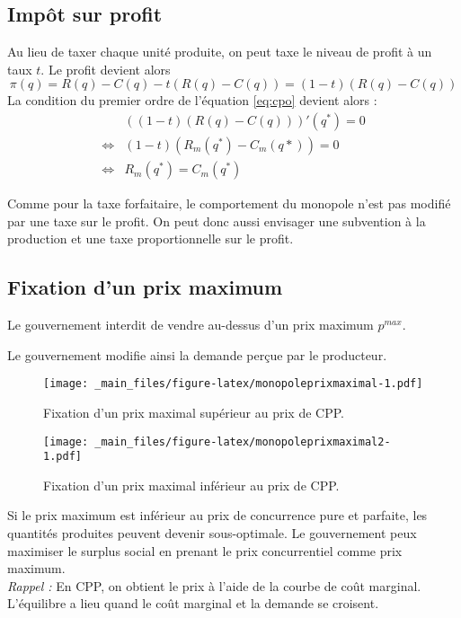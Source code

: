 \documentclass[
]{book}
\theoremstyle{definition}
\theoremstyle{definition}
\theoremstyle{definition}
\theoremstyle{definition}
\theoremstyle{remark}
\begin{document}
\hypertarget{impuxf4t-sur-profit}{%
\subsection{Impôt sur profit}\label{impuxf4t-sur-profit}}

Au lieu de taxer chaque unité produite, on peut taxe le niveau de profit à un taux \(t\).
Le profit devient alors
\[
\pi(q) = R(q) - C(q) -t( R(q) - C(q)) = (1-t)(R(q) - C(q))
\]
La condition du premier ordre de l'équation \eqref{eq:cpo} devient alors :
\[
\begin{array}{rl}
&((1-t)(R(q)-C(q)))'(q^*) = 0\\
\Leftrightarrow & (1-t)(R_m(q^*)-C_m(q*)) = 0\\
\Leftrightarrow & R_m(q^*) = C_m(q^*)
\end{array}
\]

Comme pour la taxe forfaitaire, le comportement du monopole n'est pas modifié par une taxe sur le profit.
On peut donc aussi envisager une subvention à la production et une taxe proportionnelle sur le profit.

\hypertarget{fixation-dun-prix-maximum}{%
\subsection{Fixation d'un prix maximum}\label{fixation-dun-prix-maximum}}

Le gouvernement interdit de vendre au-dessus d'un prix maximum \(p^{max}\).

Le gouvernement modifie ainsi la demande perçue par le producteur.

\begin{figure}
\centering
\texttt{[image: \_main\_files/figure-latex/monopoleprixmaximal-1.pdf]}
\caption{\label{fig:monopoleprixmaximal}Fixation d'un prix maximal supérieur au prix de CPP.}
\end{figure}

\begin{figure}
\centering
\texttt{[image: \_main\_files/figure-latex/monopoleprixmaximal2-1.pdf]}
\caption{\label{fig:monopoleprixmaximal2}Fixation d'un prix maximal inférieur au prix de CPP.}
\end{figure}

Si le prix maximum est inférieur au prix de concurrence pure et parfaite, les quantités produites peuvent devenir sous-optimale.
Le gouvernement peux maximiser le surplus social en prenant le prix concurrentiel comme prix maximum.\\
\emph{Rappel :} En CPP, on obtient le prix à l'aide de la courbe de coût marginal.
L'équilibre a lieu quand le coût marginal et la demande se croisent.
\end{document}
